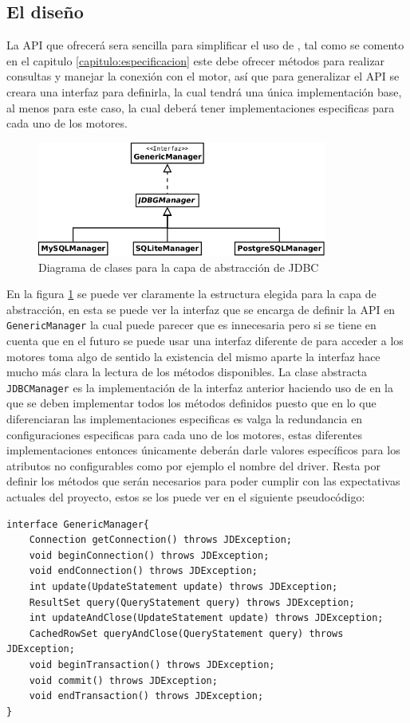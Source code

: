 \subsection{El diseño}
La API que ofrecerá \jj sera sencilla para simplificar el uso de \jd, tal  como se comento en el capitulo \ref{capitulo:especificacion} este debe ofrecer métodos para realizar consultas y manejar la conexión con el motor, así que para generalizar el API se creara una interfaz para definirla, la cual tendrá una única implementación base, al menos para este caso, la cual deberá tener implementaciones especificas para cada uno de los motores.
%
\begin{figure}[h]
  \centering
    \includegraphics[width=0.85\textwidth]{figuras/jdbgm-jdbc.png}
  \caption{Diagrama de clases para la capa de abstracción de JDBC}
  \label{fig:jdbgm-jdbc}
\end{figure}

En la figura \ref{fig:jdbgm-jdbc} se puede ver claramente la estructura elegida para la capa de abstracción, en esta se puede ver la interfaz que se encarga de definir la API en \verb=GenericManager= la cual puede parecer que es innecesaria pero si se tiene en cuenta que en el futuro se puede usar una interfaz diferente de \jd para acceder a los motores toma algo de sentido la existencia del mismo aparte la interfaz hace mucho más clara la lectura de los métodos disponibles. La clase abstracta \verb=JDBCManager= es la implementación de la interfaz anterior haciendo uso de \jd en la que se deben implementar todos los métodos definidos puesto que en lo que diferenciaran las implementaciones especificas es valga la redundancia en configuraciones especificas para cada uno de los motores, estas diferentes implementaciones entonces únicamente deberán darle valores específicos para los atributos no configurables como por ejemplo el nombre del driver. Resta por definir los métodos que serán necesarios para poder cumplir con las expectativas actuales del proyecto, estos se los puede ver en el siguiente pseudocódigo:
%
\begin{lstlisting}[title=interfaz GenericManager]
interface GenericManager{
	Connection getConnection() throws JDException;
	void beginConnection() throws JDException;
	void endConnection() throws JDException;
	int update(UpdateStatement update) throws JDException;
	ResultSet query(QueryStatement query) throws JDException;
	int updateAndClose(UpdateStatement update) throws JDException;
	CachedRowSet queryAndClose(QueryStatement query) throws JDException;
	void beginTransaction() throws JDException;
	void commit() throws JDException;
	void endTransaction() throws JDException;
}
\end{lstlisting}
%

